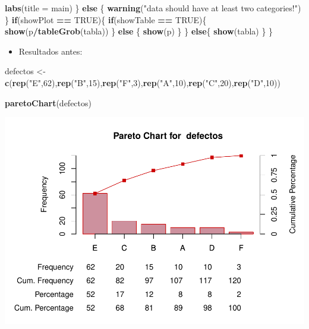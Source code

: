 \documentclass[
]{book}
\newenvironment{Shaded}{\begin{snugshade}}{\end{snugshade}}
\newcommand{\AttributeTok}[1]{\textcolor[rgb]{0.13,0.29,0.53}{#1}}
\newcommand{\ConstantTok}[1]{\textcolor[rgb]{0.56,0.35,0.01}{#1}}
\newcommand{\ControlFlowTok}[1]{\textcolor[rgb]{0.13,0.29,0.53}{\textbf{#1}}}
\newcommand{\DecValTok}[1]{\textcolor[rgb]{0.00,0.00,0.81}{#1}}
\newcommand{\FunctionTok}[1]{\textcolor[rgb]{0.13,0.29,0.53}{\textbf{#1}}}
\newcommand{\NormalTok}[1]{#1}
\newcommand{\OtherTok}[1]{\textcolor[rgb]{0.56,0.35,0.01}{#1}}
\newcommand{\SpecialCharTok}[1]{\textcolor[rgb]{0.81,0.36,0.00}{\textbf{#1}}}
\newcommand{\StringTok}[1]{\textcolor[rgb]{0.31,0.60,0.02}{#1}}
\providecommand{\tightlist}{%
  \setlength{\itemsep}{0pt}\setlength{\parskip}{0pt}}
\begin{document}
\begin{Shaded}
\begin{Highlighting}[]
      \FunctionTok{labs}\NormalTok{(}\AttributeTok{title =}\NormalTok{ main)}
\NormalTok{  \}}
  \ControlFlowTok{else}\NormalTok{ \{}
    \FunctionTok{warning}\NormalTok{(}\StringTok{"data should have at least two categories!"}\NormalTok{)}
\NormalTok{  \}}
  \ControlFlowTok{if}\NormalTok{(showPlot }\SpecialCharTok{==} \ConstantTok{TRUE}\NormalTok{)\{}
    \ControlFlowTok{if}\NormalTok{(showTable }\SpecialCharTok{==} \ConstantTok{TRUE}\NormalTok{)\{}
        \FunctionTok{show}\NormalTok{(p}\SpecialCharTok{/}\FunctionTok{tableGrob}\NormalTok{(tabla))}
\NormalTok{    \}}
    \ControlFlowTok{else}\NormalTok{ \{}
      \FunctionTok{show}\NormalTok{(p)}
\NormalTok{    \}}
\NormalTok{  \}}
  \ControlFlowTok{else}\NormalTok{\{}
    \FunctionTok{show}\NormalTok{(tabla)}
\NormalTok{  \}}
\NormalTok{\}}
\end{Highlighting}
\end{Shaded}

\begin{itemize}
\tightlist
\item
  Resultados antes:
\end{itemize}

\begin{Shaded}
\begin{Highlighting}[]
\NormalTok{defectos }\OtherTok{\textless{}{-}}\FunctionTok{c}\NormalTok{(}\FunctionTok{rep}\NormalTok{(}\StringTok{"E"}\NormalTok{,}\DecValTok{62}\NormalTok{),}\FunctionTok{rep}\NormalTok{(}\StringTok{"B"}\NormalTok{,}\DecValTok{15}\NormalTok{),}\FunctionTok{rep}\NormalTok{(}\StringTok{"F"}\NormalTok{,}\DecValTok{3}\NormalTok{),}\FunctionTok{rep}\NormalTok{(}\StringTok{"A"}\NormalTok{,}\DecValTok{10}\NormalTok{),}\FunctionTok{rep}\NormalTok{(}\StringTok{"C"}\NormalTok{,}\DecValTok{20}\NormalTok{),}\FunctionTok{rep}\NormalTok{(}\StringTok{"D"}\NormalTok{,}\DecValTok{10}\NormalTok{))}

\FunctionTok{paretoChart}\NormalTok{(defectos)}
\end{Highlighting}
\end{Shaded}

\includegraphics{Libro_TidyQualityTools_files/figure-latex/unnamed-chunk-137-1.pdf}
\end{document}
